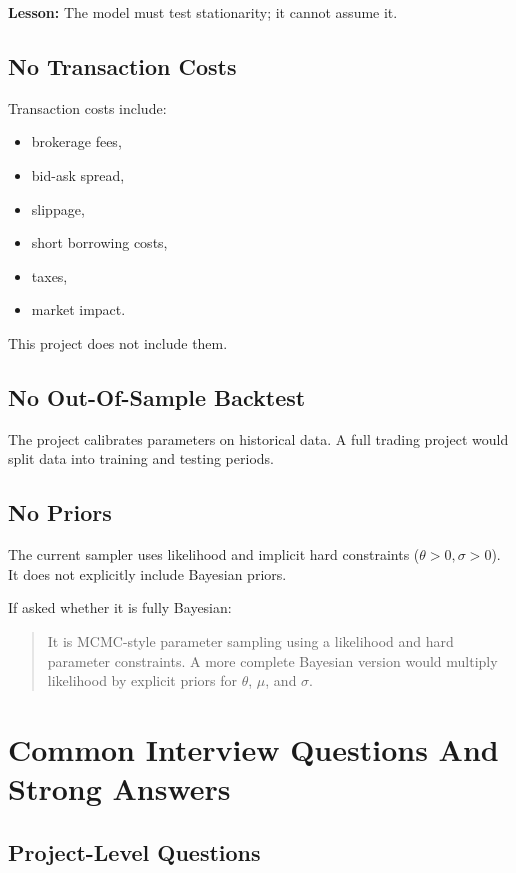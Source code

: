\documentclass[11pt]{article}
\begin{document}
\textbf{Lesson:} The model must test stationarity; it cannot assume it.

\subsection{No Transaction Costs}

Transaction costs include:

\begin{itemize}
  \item brokerage fees,
  \item bid-ask spread,
  \item slippage,
  \item short borrowing costs,
  \item taxes,
  \item market impact.
\end{itemize}

This project does not include them.

\subsection{No Out-Of-Sample Backtest}

The project calibrates parameters on historical data. A full trading project
would split data into training and testing periods.

\subsection{No Priors}

The current sampler uses likelihood and implicit hard constraints
($\theta>0,\sigma>0$). It does not explicitly include Bayesian priors.

If asked whether it is fully Bayesian:

\begin{quote}
It is MCMC-style parameter sampling using a likelihood and hard parameter
constraints. A more complete Bayesian version would multiply likelihood by
explicit priors for $\theta$, $\mu$, and $\sigma$.
\end{quote}

\section{Common Interview Questions And Strong Answers}

\subsection{Project-Level Questions}
\end{document}
